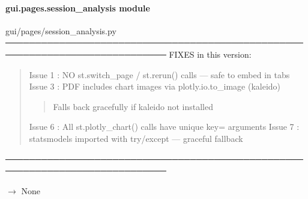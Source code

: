 \documentclass[letterpaper,10pt,english]{sphinxmanual}
\begin{document}
\begin{fulllineitems}
\label{\detokenize{gui.pages.schema_docs:gui.pages.schema_docs.render}}
\pysigstartsignatures
\pysiglinewithargsret
{}
{}
{}
\pysigstopsignatures
\end{fulllineitems}


\sphinxstepscope


\paragraph{gui.pages.session\_analysis module}
\label{\detokenize{gui.pages.session_analysis:module-gui.pages.session_analysis}}\label{\detokenize{gui.pages.session_analysis:gui-pages-session-analysis-module}}\label{\detokenize{gui.pages.session_analysis::doc}}
\sphinxAtStartPar
gui/pages/session\_analysis.py
─────────────────────────────────────────────────────────────────────────────
FIXES in this version:
\begin{quote}

\sphinxAtStartPar
Issue 1  : NO st.switch\_page / st.rerun() calls — safe to embed in tabs
Issue 3  : PDF includes chart images via plotly.io.to\_image (kaleido)
\begin{quote}

\sphinxAtStartPar
Falls back gracefully if kaleido not installed
\end{quote}

\sphinxAtStartPar
Issue 6  : All st.plotly\_chart() calls have unique key= arguments
Issue 7  : statsmodels imported with try/except — graceful fallback
\end{quote}

\sphinxAtStartPar
─────────────────────────────────────────────────────────────────────────────

\begin{fulllineitems}
\label{\detokenize{gui.pages.session_analysis:gui.pages.session_analysis.render}}
\pysigstartsignatures
\pysiglinewithargsret
{}
{}
{{ $\rightarrow$ None}}
\pysigstopsignatures
\end{fulllineitems}
\end{document}
